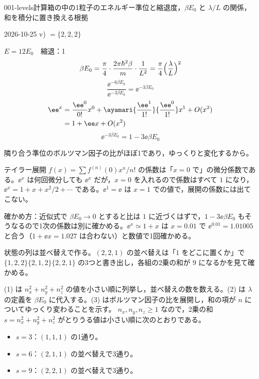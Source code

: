 \documentclass[uplatex,dvipdfmx,a4paper,11pt]{jsarticle}
\begin{document}
\begin{mondai}{001-levels}{計算}{箱の中の1粒子のエネルギー準位と縮退度，$\beta E_0$ と $\lambda/L$ の関係，和を積分に置き換える根拠}
\begin{kotaeutsushi}{2026-10-25}
v) $=\{2,2,2\}$

$E=12E_0$　縮退：1
\[ \beta E_0=\frac{\pi}{4}\cdot\frac{2\pi\hbar^{2}\beta}{m}\cdot\frac{1}{L^{2}}=\frac{\pi}{4}\Bigl(\frac{\lambda}{L}\Bigr)^{2} \]
\[ \frac{\ee^{-6\beta E_0}}{\ee^{-3\beta E_0}}=\ee^{-3\beta E_0} \]
\begin{align*}
\ee^{x}&=\frac{\ee^{0}}{0!}x^{0}+\ayamari{\frac{\ee^{1}}{1!}}{\frac{\ee^{0}}{1!}}x^{1}+O(x^{2})\\
&=1+\ee x+O(x^{2})
\end{align*}
\[ \ee^{-3\beta E_0}=1-3\ee\beta E_0 \]

隣り合う準位のボルツマン因子の比がほぼ1であり，ゆっくりと変化するから。
\end{kotaeutsushi}
\begin{kizuki}
\item テイラー展開 $f(x)=\sum f^{(n)}(0)x^{n}/n!$ の係数は「$x=0$ で」の微分係数である。$\ee^{x}$ は何回微分しても $\ee^{x}$ だが，$x=0$ を入れるので係数はすべて $1$ になり，$\ee^{x}=1+x+x^{2}/2+\cdots$ である。$\ee^{1}=\ee$ は $x=1$ での値で，展開の係数には出てこない。
\item 確かめ方：近似式で $\beta E_0\to0$ とすると比は $1$ に近づくはずで，$1-3\ee\beta E_0$ もそうなるので1次の係数は別に確かめる。$\ee^{x}\simeq1+x$ は $x=0.01$ で $\ee^{0.01}=1.01005$ と合う（$1+\ee x=1.027$ は合わない）と数値で1回確かめる。
\item 状態の列は並べ替えで作る。$(2,2,1)$ の並べ替えは「$1$ をどこに置くか」で $\{1,2,2\}\{2,1,2\}\{2,2,1\}$ の3つと書き出し，各組の2乗の和が $9$ になるかを見て確かめる。
\end{kizuki}
\begin{tadashii}
\houshin (1) は $n_x^{2}+n_y^{2}+n_z^{2}$ の値を小さい順に列挙し，並べ替えの数を数える。(2) は $\lambda$ の定義を $\beta E_0$ に代入する。(3) はボルツマン因子の比を展開し，和の項が $n$ についてゆっくり変わることを示す。
\keisan {} $n_x,n_y,n_z\ge1$ なので，2乗の和 $s=n_x^{2}+n_y^{2}+n_z^{2}$ がとりうる値は小さい順に次のとおりである。
\begin{itemize}
  \item $s=3$：$(1,1,1)$ の1通り。
  \item $s=6$：$(2,1,1)$ の並べ替えで3通り。
  \item $s=9$：$(2,2,1)$ の並べ替えで3通り。

\end{itemize}
\end{tadashii}
\end{mondai}
\end{document}
